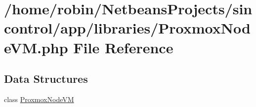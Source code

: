 \hypertarget{_proxmox_node_v_m_8php}{}\section{/home/robin/\+Netbeans\+Projects/sincontrol/app/libraries/\+Proxmox\+Node\+V\+M.php File Reference}
\label{_proxmox_node_v_m_8php}
\subsection*{Data Structures}
\begin{DoxyCompactItemize}
\item 
class \hyperlink{class_proxmox_node_v_m}{Proxmox\+Node\+V\+M}
\end{DoxyCompactItemize}
